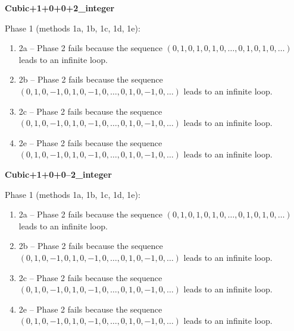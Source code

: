 \begin{exmp}
\label{ex:compareAR}

\textbf{Cubic+1+0+0+2\_integer}

Phase 1 (methods 1a, 1b, 1c, 1d, 1e):
\begin{enumerate}[ ]
\item  2a -- Phase 2   fails because  the sequence $(0, 1, 0, 1, 0, 1, 0, \dots ,0, 1, 0, 1, 0, \dots)$ leads to an infinite loop.
\item  2b -- Phase 2   fails because  the sequence $(0, 1, 0, -1, 0, 1, 0, -1, 0, \dots ,0, 1, 0, -1, 0, \dots)$ leads to an infinite loop.
\item  2c -- Phase 2   fails because  the sequence $(0, 1, 0, -1, 0, 1, 0, -1, 0, \dots ,0, 1, 0, -1, 0, \dots)$ leads to an infinite loop.
\item  2e -- Phase 2   fails because  the sequence $(0, 1, 0, -1, 0, 1, 0, -1, 0, \dots ,0, 1, 0, -1, 0, \dots)$ leads to an infinite loop.
\end{enumerate}


\end{exmp}




\begin{exmp}
\label{ex:compareAS}

\textbf{Cubic+1+0+0--2\_integer}

Phase 1 (methods 1a, 1b, 1c, 1d, 1e):
\begin{enumerate}[ ]
\item  2a -- Phase 2   fails because  the sequence $(0, 1, 0, 1, 0, 1, 0, \dots ,0, 1, 0, 1, 0, \dots)$ leads to an infinite loop.
\item  2b -- Phase 2   fails because  the sequence $(0, 1, 0, -1, 0, 1, 0, -1, 0, \dots ,0, 1, 0, -1, 0, \dots)$ leads to an infinite loop.
\item  2c -- Phase 2   fails because  the sequence $(0, 1, 0, -1, 0, 1, 0, -1, 0, \dots ,0, 1, 0, -1, 0, \dots)$ leads to an infinite loop.
\item  2e -- Phase 2   fails because  the sequence $(0, 1, 0, -1, 0, 1, 0, -1, 0, \dots ,0, 1, 0, -1, 0, \dots)$ leads to an infinite loop.
\end{enumerate}


\end{exmp}




